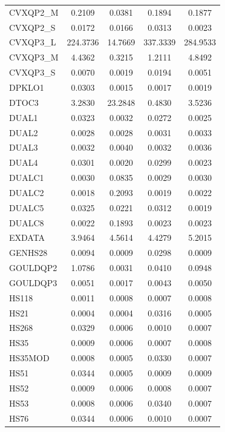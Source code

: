 \begin{longtable}{lcccc}
CVXQP2\_M &   0.2109 &   0.0381 &   0.1894 &   0.1877 \\
CVXQP2\_S &   0.0172 &   0.0166 &   0.0313 &   0.0023 \\
CVXQP3\_L & 224.3736 &  14.7669 & 337.3339 & 284.9533 \\
CVXQP3\_M &   4.4362 &   0.3215 &   1.2111 &   4.8492 \\
CVXQP3\_S &   0.0070 &   0.0019 &   0.0194 &   0.0051 \\
DPKLO1   &   0.0303 &   0.0015 &   0.0017 &   0.0019 \\
DTOC3    &   3.2830 &  23.2848 &   0.4830 &   3.5236 \\
DUAL1    &   0.0323 &   0.0032 &   0.0272 &   0.0025 \\
DUAL2    &   0.0028 &   0.0028 &   0.0031 &   0.0033 \\
DUAL3    &   0.0032 &   0.0040 &   0.0032 &   0.0036 \\
DUAL4    &   0.0301 &   0.0020 &   0.0299 &   0.0023 \\
DUALC1   &   0.0030 &   0.0835 &   0.0029 &   0.0030 \\
DUALC2   &   0.0018 &   0.2093 &   0.0019 &   0.0022 \\
DUALC5   &   0.0325 &   0.0221 &   0.0312 &   0.0019 \\
DUALC8   &   0.0022 &   0.1893 &   0.0023 &   0.0023 \\
EXDATA   &   3.9464 &   4.5614 &   4.4279 &   5.2015 \\
GENHS28  &   0.0094 &   0.0009 &   0.0298 &   0.0009 \\
GOULDQP2 &   1.0786 &   0.0031 &   0.0410 &   0.0948 \\
GOULDQP3 &   0.0051 &   0.0017 &   0.0043 &   0.0050 \\
HS118    &   0.0011 &   0.0008 &   0.0007 &   0.0008 \\
HS21     &   0.0004 &   0.0004 &   0.0316 &   0.0005 \\
HS268    &   0.0329 &   0.0006 &   0.0010 &   0.0007 \\
HS35     &   0.0009 &   0.0006 &   0.0007 &   0.0008 \\
HS35MOD  &   0.0008 &   0.0005 &   0.0330 &   0.0007 \\
HS51     &   0.0344 &   0.0005 &   0.0009 &   0.0009 \\
HS52     &   0.0009 &   0.0006 &   0.0008 &   0.0007 \\
HS53     &   0.0008 &   0.0006 &   0.0340 &   0.0007 \\
HS76     &   0.0344 &   0.0006 &   0.0010 &   0.0007 \\

\end{longtable}
